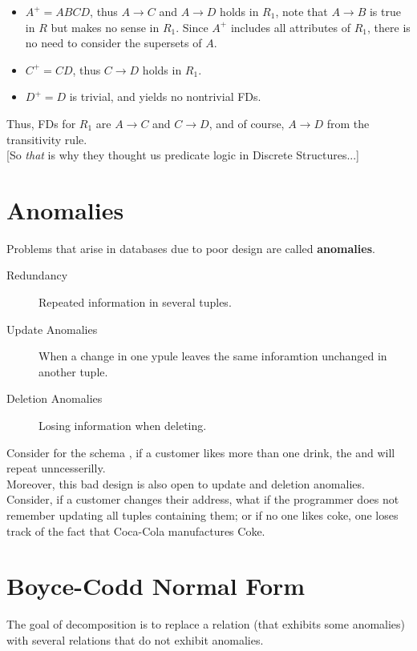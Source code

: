 \documentclass[11pt,a4paper,twocolumn]{book}
\begin{document}
\begin{itemize}
\item $A^+ = ABCD$, thus $A \to C$ and $A \to D$ holds in $R_1$, note that $A \to B$ is true in $R$ but makes no sense in $R_1$. Since $A^+$ includes all attributes of $R_1$, there is no need to consider the supersets of $A$. 
\item $C^+ = CD$, thus $C \to D$ holds in $R_1$.
\item $D^+ = D$ is trivial, and yields no nontrivial FDs.
\end{itemize}

Thus, FDs for $R_1$ are $A \to C$ and $C \to D$, and of course, $A \to D$ from the transitivity rule.\\

[So \textit{that} is why they thought us predicate logic in Discrete Structures...]

\section{Anomalies}

Problems that arise in databases due to poor design are called \textbf{anomalies}.

\begin{description}
\item[Redundancy] Repeated information in several tuples.
\item[Update Anomalies] When a change in one ypule leaves the same inforamtion unchanged in another tuple.
\item[Deletion Anomalies] Losing information when deleting.
\end{description}

Consider for the schema , if a customer likes more than one drink, the  and  will repeat unncesserilly.\\

Moreover, this bad design is also open to update and deletion anomalies. Consider, if a customer changes their address, what if the programmer does not remember updating all tuples containing them; or if no one likes coke, one loses track of the fact that Coca-Cola manufactures Coke.

\section{Boyce-Codd Normal Form}

The goal of decomposition is to replace a relation (that exhibits some anomalies) with several relations that do not exhibit anomalies.\\
\end{document}
